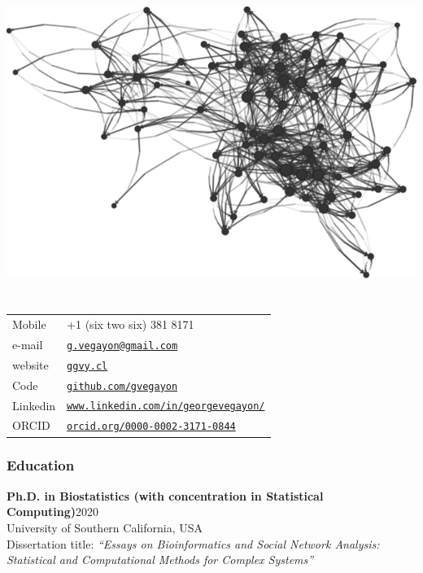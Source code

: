 \documentclass[letterpaper, 11pt]{article}
\def\name{George G. Vega Yon}
\renewcommand{\bf}{\bfseries\color{teal}}
\begin{document}
\hfill \includegraphics[width=.4\linewidth]{fig/ukfaculty.pdf}\vspace{-6cm}
\part*{\color{darkgray}{\name}}


\begin{minipage}{0.50\linewidth}
  \begin{tabular}{>{}p{.2\linewidth}p{.79\linewidth}}
    Mobile & +1 (six two six) 381 8171 \\
    e-mail & \href{mailto:g.vegayon@gmail.com}{\tt g.vegayon@gmail.com} \\
    website & \href{https://ggvy.cl}{\tt ggvy.cl} \\
    Code & \href{https://github.com/gvegayon}{\tt github.com/gvegayon}\\
    Linkedin & \href{https://www.linkedin.com/in/georgevegayon/}{\tt www.linkedin.com/in/georgevegayon/} \\
    ORCID & \href{https://orcid.org/0000-0002-3171-0844}{\tt orcid.org/0000-0002-3171-0844}
  \end{tabular}
\end{minipage}


\section*{Education}


\noindent 
{\bf Ph.D. in Biostatistics (with concentration in Statistical Computing)}\hfill 2020\\
University of Southern California, USA\\
Dissertation title: \emph{``Essays on Bioinformatics and Social Network Analysis: Statistical and Computational Methods for Complex Systems''}\vspace{.5cm}
\end{document}
